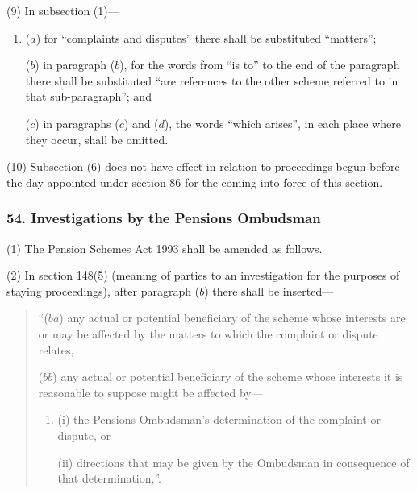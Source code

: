 \documentclass[12pt,a4paper]{article}
\begin{document}
(9) In subsection (1)—
\begin{enumerate}\item[]
($a$) for “complaints and disputes” there shall be substituted “matters”;

($b$) in paragraph ($b$), for the words from “is to” to the end of the paragraph there shall be substituted “are references to the other scheme referred to in that sub-paragraph”; and

($c$) in paragraphs ($c$)  and ($d$), the words “which arises”, in each place where they occur, shall be omitted.
\end{enumerate}

(10) Subsection (6)  does not have effect in relation to proceedings begun before the day appointed under section 86 for the coming into force of this section.

\subsubsection{54. Investigations by the Pensions Ombudsman}

(1) The Pension Schemes Act 1993 shall be amended as follows.

(2) In section 148(5)  (meaning of parties to an investigation for the purposes of staying proceedings), after paragraph ($b$)  there shall be inserted—
\begin{quotation}
“($ba$) any actual or potential beneficiary of the scheme whose interests are or may be affected by the matters to which the complaint or dispute relates,

($bb$) any actual or potential beneficiary of the scheme whose interests it is reasonable to suppose might be affected by—
\begin{enumerate}\item[]
(i) the Pensions Ombudsman’s determination of the complaint or dispute, or

(ii) directions that may be given by the Ombudsman in consequence of that determination,”.
\end{enumerate}
\end{quotation}
\end{document}
